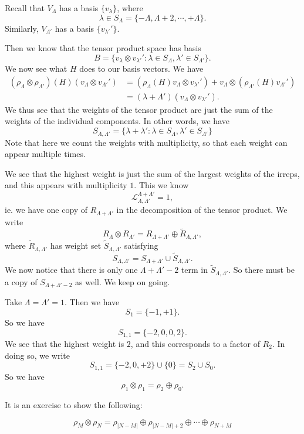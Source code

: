 \documentclass[a4paper]{article}
\begin{document}
Recall that $V_\Lambda$ has a basis $\{v_\lambda\}$, where
\[
  \lambda \in S_\Lambda = \{-\Lambda, \Lambda + 2, \cdots, + \Lambda\}.
\]
Similarly, $V_{\Lambda'}$ has a basis $\{v_{\lambda'}'\}$.

Then we know that the tensor product space has basis
\[
  B = \{v_\lambda \otimes v_{\lambda'}': \lambda \in S_{\Lambda}, \lambda' \in S_{\Lambda'}\}.
\]
We now see what $H$ does to our basis vectors. We have
\begin{align*}
  (\rho_\Lambda \otimes \rho_{\Lambda'})(H)(v_\Lambda \otimes v_{\Lambda'}') &= (\rho_\Lambda(H)v_\Lambda \otimes v_{\lambda'}') + v_\Lambda \otimes (\rho_{\Lambda'}(H)v_{\Lambda'}')\\
  &= (\lambda + \Lambda')(v_\Lambda \otimes v_{\lambda'}').
\end{align*}
We thus see that the weights of the tensor product are just the sum of the weights of the individual components. In other words, we have
\[
  S_{\Lambda, \Lambda'} = \{\lambda + \lambda': \lambda \in S_\Lambda, \lambda' \in S_{\Lambda'}\}
\]
Note that here we count the weights with multiplicity, so that each weight can appear multiple times.

We see that the highest weight is just the sum of the largest weights of the irreps, and this appears with multiplicity $1$. This we know
\[
  \mathcal{L}_{\Lambda, \Lambda'}^{\Lambda + \Lambda'} = 1,
\]
ie. we have one copy of $R_{\Lambda + \Lambda'}$ in the decomposition of the tensor product. We write
\[
  R_\Lambda \otimes R_{\Lambda'} = R_{\Lambda + \Lambda'} \oplus \tilde{R}_{\Lambda, \Lambda'},
\]
where $\tilde{R}_{\Lambda, \Lambda'}$ has weight set $\tilde{S}_{\Lambda, \Lambda'}$ satisfying
\[
  S_{\Lambda, \Lambda'} = S_{\Lambda + \Lambda'} \cup \tilde{S}_{\Lambda, \Lambda'}.
\]
We now notice that there is only one $\Lambda + \Lambda' - 2$ term in $\tilde{S}_{\Lambda, \Lambda'}$. So there must be a copy of $S_{\Lambda + \Lambda' - 2}$ as well. We keep on going.

\begin{eg}
  Take $\Lambda = \Lambda' = 1$. Then we have
  \[
    S_1 = \{-1, +1\}.
  \]
  So we have
  \[
    S_{1, 1} = \{-2, 0, 0, 2\}.
  \]
  We see that the highest weight is $2$, and this corresponds to a factor of $R_2$. In doing so, we write
  \[
    S_{1, 1} = \{-2, 0, +2\} \cup \{0\} = S_2 \cup S_0.
  \]
  So we have
  \[
    \rho_1 \otimes \rho_1 = \rho_2 \oplus \rho_0.
  \]
\end{eg}

It is an exercise to show the following:
\begin{prop}
  \[
    \rho_M \otimes \rho_N = \rho_{|N - M|} \oplus \rho_{|N - M| + 2} \oplus \cdots \oplus \rho_{N + M}
  \]
\end{prop}
\end{document}
